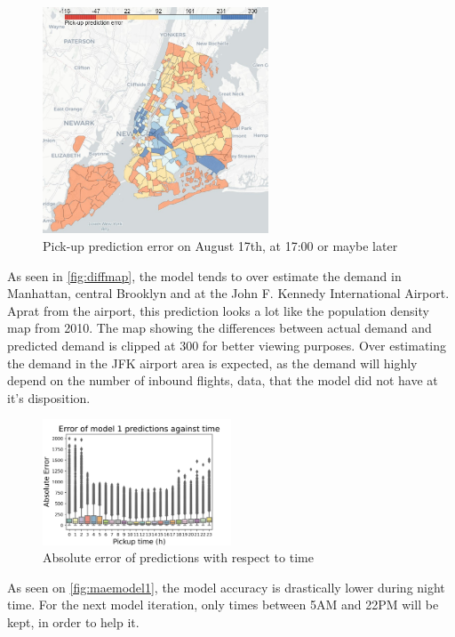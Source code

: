 \documentclass[11pt]{article}
\begin{document}
\begin{figure}
    \includegraphics[width=0.60\textwidth]{august2019pudiffmap.jpg}
    \centering
    \caption{Pick-up prediction error on August 17th, at 17:00 or maybe later} 
\end{figure}\label{fig:diffmap}

As seen in \autoref{fig:diffmap}, the model tends to over estimate the demand in Manhattan, central Brooklyn and at the John F. Kennedy International Airport. Aprat from the airport, this prediction looks a lot like the population density map from 2010. The map showing the differences between actual demand and predicted demand is clipped at 300 for better viewing purposes. Over estimating the demand in the JFK airport area is expected, as the demand will highly depend on the number of inbound flights, data, that the model did not have at it's disposition.
\begin{figure}
    \includegraphics[width=0.5\textwidth]{model1_error_hour.jpeg}
    \centering
    \caption{Absolute error of predictions with respect to time} 
\end{figure}\label{fig:maemodel1}
As seen on \autoref{fig:maemodel1}, the model accuracy is drastically lower during night time. For the next model iteration, only times between 5AM and 22PM will be kept, in order to help it. 
\end{document}
